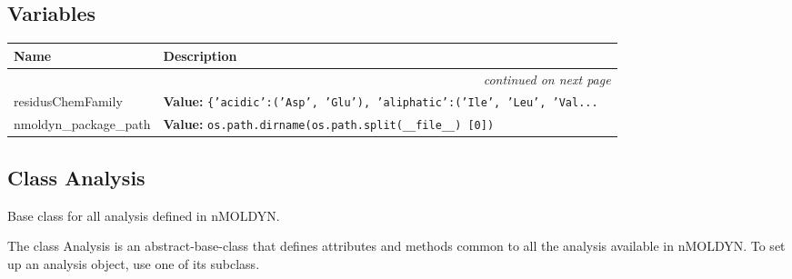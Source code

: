 
  \subsection{Variables}

    \vspace{-1cm}
\hspace{\varindent}\begin{longtable}{|p{\varnamewidth}|p{\vardescrwidth}|l}
\cline{1-2}
\cline{1-2} \centering \textbf{Name} & \centering \textbf{Description}& \\
\cline{1-2}
\endhead\cline{1-2}\multicolumn{3}{r}{\small\textit{continued on next page}}\\\endfoot\cline{1-2}
\endlastfoot\raggedright r\-e\-s\-i\-d\-u\-s\-C\-h\-e\-m\-F\-a\-m\-i\-l\-y\- & \raggedright \textbf{Value:} 
{\tt \{'acidic':('Asp', 'Glu'), 'aliphatic':('Ile', 'Leu', 'Val\texttt{...}}&\\
\cline{1-2}
\raggedright n\-m\-o\-l\-d\-y\-n\-\_\-p\-a\-c\-k\-a\-g\-e\-\_\-p\-a\-t\-h\- & \raggedright \textbf{Value:} 
{\tt os.path.dirname(os.path.split(\_\_file\_\_) [0])}&\\
\cline{1-2}
\end{longtable}



\subsection{Class Analysis}

    \label{nMOLDYN:Analysis:Analysis:Analysis}
Base class for all analysis defined in nMOLDYN.

The class Analysis is an abstract-base-class that defines attributes and 
methods common to all the analysis available in nMOLDYN. To set up an 
analysis object, use one of its subclass.



